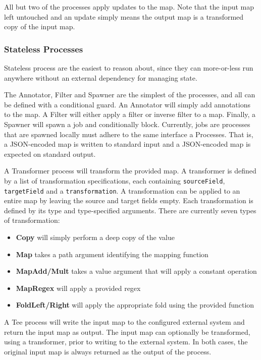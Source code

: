 \documentclass[10pt,twocolumn]{article}
\def\code#1{\texttt{#1}}
\begin{document}
All but two of the processes apply updates to the map.  Note that the input map
left untouched and an update simply means the output map is a transformed copy
of the input map.


\subsubsection{Stateless Processes}

Stateless process are the easiest to reason about, since they can more-or-less
run anywhere without an external dependency for managing state.

The Annotator, Filter and Spawner are the simplest of the processes, and all
can be defined with a conditional guard.  An Annotator will simply add
annotations to the map.  A Filter will either apply a filter or inverse filter
to a map.  Finally, a Spawner will spawn a job and conditionally block.
Currently, jobs are processes that are spawned locally must adhere to the same
interface a Processes.  That is, a JSON-encoded map is written to standard
input and a JSON-encoded map is expected on standard output.

A Transformer process will transform the provided map.  A transformer is
defined by a list of transformation specifications, each containing
\code{sourceField}, \code{targetField} and a \code{transformation}.  A transformation can be
applied to an entire map by leaving the source and target fields empty.  Each
transformation is defined by its type and type-specified arguments.  There are
currently seven types of transformation:

\begin{itemize}
\item[]{\bfseries Copy} will simply perform a deep copy of the value
\item[]{\bfseries Map} takes a path argument identifying the mapping function
\item[]{\bfseries MapAdd/Mult} takes a value argument that will apply a constant operation
\item[]{\bfseries MapRegex} will apply a provided regex
\item[]{\bfseries FoldLeft/Right} will apply the appropriate fold using the provided function
\end{itemize}

A Tee process will write the input map to the configured external system and
return the input map as output.  The input map can optionally be transformed,
using a transformer, prior to writing to the external system.  In both cases,
the original input map is always returned as the output of the process.  
\end{document}

